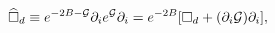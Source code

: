 \begin{equation}
\widehat{\square}_d\equiv e^{-2B-{\cal G}}\partial_ie^{\cal{G}}\partial_i
=e^{-2B}[\square_d+(\partial_i{\cal G})\partial_i],
\label{eq:wtsq}
\end{equation}

